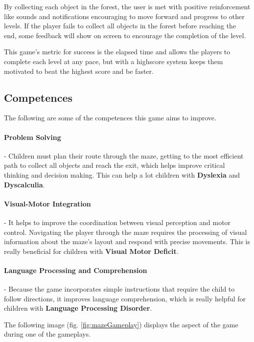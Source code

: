 By collecting each object in the forest, the user is met with positive reinforcement like sounds and notifications encouraging to move forward and progress to other levels. If the player fails to collect all objects in the forest before reaching the end, some feedback will show on screen to encourage the completion of the level.

This game's metric for success is the elapsed time and allows the players to complete each level at any pace, but with a highscore system keeps them motivated to beat the highest score and be faster.

\subsection*{Competences}
The following are some of the competences this game aims to improve.

\paragraph{Problem Solving}- Children must plan their route through the maze, getting to the most efficient path to collect all objects and reach the exit, which helps improve critical thinking and decision making. This can help a lot children with \textbf{Dyslexia} and \textbf{Dyscalculia}.

\paragraph{Visual-Motor Integration}- It helps to improve the coordination between visual perception and motor control. Navigating the player through the maze requires the processing of visual information about the maze's layout and respond with precise movements. This is really beneficial for children with \textbf{Visual Motor Deficit}.

\paragraph{Language Processing and Comprehension}- Because the game incorporates simple instructions that require the child to follow directions, it improves language comprehension, which is really helpful for children with \textbf{Language Processing Disorder}.

The following image (fig. \ref{fig:mazeGameplay}) displays the aspect of the game during one of the gameplays.


